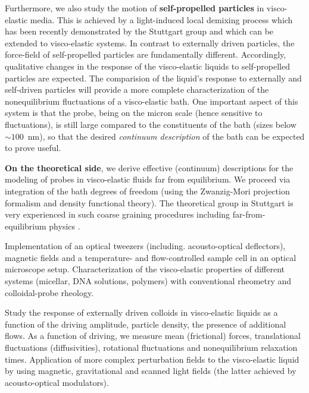 \begin{workpackage}
\begin{wpdescription}
Furthermore, we also study the motion of {\bf self-propelled particles} in visco-elastic media. This is achieved by a light-induced local demixing process which has been recently demonstrated by the Stuttgart group \cite{kuemmel2013, buttinoni2013, tenHagen2014} and which can be extended to visco-elastic systems. In contrast to externally driven particles, the force-field of self-propelled particles are fundamentally different. Accordingly, qualitative changes in the response of the visco-elastic liquids to self-propelled particles are expected. The comparision of the liquid's response to externally and self-driven particles will provide a more complete characterization of the
nonequilibrium fluctuations of a visco-elastic bath. One important aspect of this system is that the
probe, being on the micron scale (hence sensitive to fluctuations), is still large compared
to the constituents of the bath (sizes below $\sim 100$~nm), so that the desired {\it
  continuum description} of the bath can be expected to prove useful.

{\bf On the theoretical side}, we derive effective (continuum) descriptions for the
modeling of probes in visco-elastic fluids far from equilibrium. We proceed via
integration of the bath degrees of freedom (using the Zwanzig-Mori projection formalism and
density functional theory).
%
The theoretical group in Stuttgart is very experienced in such coarse graining procedures
\cite{Aerov14} including far-from-equilibrium physics \cite{Kruger11,Kruger09}.


\printbibliography[heading=proposal-bib,env=proposal-env]

\end{wpdescription}

\begin{tasklist}

\begin{task}[title=Experimental setup,id=brown-t1,PM=24,lead=USTUTT,wphases=0-24!0.5]
Implementation of an optical tweezers (including. acousto-optical deflectors), magnetic fields and a temperature- and flow-controlled sample cell in an optical microscope setup. Characterization of the visco-elastic properties of different systems (micellar, DNA solutions, polymers) with conventional rheometry and colloidal-probe rheology. 
\end{task}


\begin{task}[title=Externally driven particles in visco-elastic baths,id=brown-t2,PM=24,lead=USTUTT,wphases=0-24!0.5]
Study the response of externally driven colloids in visco-elastic liquids as a function of the driving amplitude, particle density, the presence of additional flows. As a function of driving, we
measure mean (frictional) forces, translational fluctuations (diffusivities), rotational
fluctuations and nonequilibrium relaxation times. Application of more complex perturbation fields to the visco-elastic liquid by using magnetic, gravitational and scanned light fields (the latter achieved by acousto-optical modulators).
\end{task}


\end{tasklist}
\end{workpackage}
